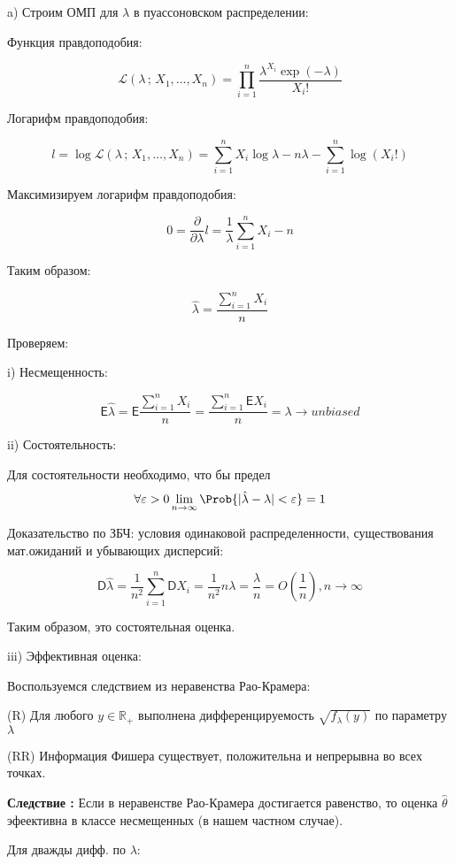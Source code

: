 \documentclass[12pt]{article}
\theoremstyle{definiton}
\theoremstyle{definition}
\theoremstyle{definition}
\let\epsilon\varepsilon
\newcommand{\Expect}{\mathsf{E}}
\begin{document}
a) Строим ОМП для $\lambda$ в пуассоновском распределении:

Функция правдоподобия:

$$\mathcal{L}(\lambda \,;\,X_1,\ldots,X_n) = \prod\limits_{i=1}^n \frac{\lambda^{X_i} \exp{(-\lambda)}}{X_i!}$$

Логарифм правдоподобия:

$$l = \log \mathcal{L}(\lambda \,;\,X_1,\ldots,X_n)= \sum\limits_{i=1}^n X_i\log{\lambda} - n \lambda - \sum\limits_{i=1}^n \log{(X_i!)}$$

Максимизируем логарифм правдоподобия:

$$0 = \frac{\partial}{\partial \lambda} l = \frac{1}{\lambda} \sum\limits_{i=1}^n X_i - n$$

Таким образом:

$$\hat \lambda = \frac{\sum\limits_{i=1}^n X_i}{n}$$

Проверяем: 

i) Несмещенность:

$$\Expect \hat \lambda = \Expect \frac{\sum\limits_{i=1}^n X_i}{n} = \frac{\sum\limits_{i=1}^n \Expect X_i}{n} = \lambda \rightarrow unbiased$$

ii) Состоятельность:

Для состоятельности необходимо, что бы предел $$ \forall \epsilon > 0 \lim_{n \to \infty} \Prob \{ |\hat\lambda - \lambda| < \epsilon \} = 1 $$

Доказательство по ЗБЧ: условия одинаковой распределенности, существования мат.ожиданий и убывающих дисперсий:

$$\mathsf{D}\hat\lambda = \frac{1}{n^2}\sum\limits_{i=1}^n \mathsf{D} X_i = \frac{1}{n^2} n \lambda = \frac{\lambda}{n} = O\left(\frac{1}{n}\right), n \to \infty$$

Таким образом, это состоятельная оценка.

iii) Эффективная оценка: 

Воспользуемся следствием из неравенства Рао-Крамера:

(R) Для любого $y \in \mathbb{R_+}$ выполнена дифференцируемость $\sqrt{f_{\lambda}(y)}$ по параметру $\lambda$

(RR) Информация Фишера существует, положительна и непрерывна во всех точках.

\textbf{Следствие :} Если в неравенстве Рао-Крамера достигается равенство, то оценка $\hat \theta$ эфеективна в классе несмещенных (в нашем частном случае).

Для дважды дифф. по $\lambda$:
\end{document}
